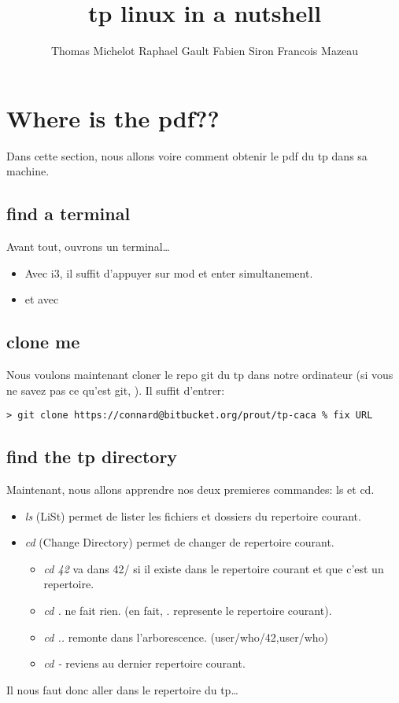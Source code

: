 \documentclass[a4paper]{article}
\title{tp \- linux in a nutshell}
\author{Thomas Michelot \- Raphael Gault \- Fabien Siron \- Francois Mazeau}
\begin{document}
\lstset{language=bash}
\maketitle
\newpage
\tableofcontents
\newpage
\section{Where is the pdf??}
Dans cette section, nous allons voire comment obtenir le pdf du tp dans
sa machine.
\subsection{find a terminal}
Avant tout, ouvrons un terminal\ldots 
\begin{itemize}
  \item Avec i3, il suffit d'appuyer sur mod et enter simultanement.
  \item et avec %
\end{itemize}
\subsection{clone me}
Nous voulons maintenant cloner le repo git du tp dans notre ordinateur (si vous
ne savez pas ce qu'est git, %
).
Il suffit d'entrer:
\begin{lstlisting}
> git clone https://connard@bitbucket.org/prout/tp-caca % fix URL
\end{lstlisting}

\subsection{find the tp directory}
Maintenant, nous allons apprendre nos deux premieres commandes: ls et cd.
\begin{itemize}
  \item \emph{ls} (LiSt) permet de lister les fichiers et dossiers du repertoire
    courant.
  \item \emph{cd} (Change Directory) permet de changer de repertoire courant.
    \begin{itemize}
      \item \emph{cd 42} va dans 42/ si il existe dans le repertoire courant et que
        c'est un repertoire.
      \item \emph{cd . } ne fait rien. (en fait, . represente le repertoire
        courant).
      \item \emph{cd ..} remonte dans l'arborescence. (user/who/42,user/who)
      \item \emph{cd -} reviens au dernier repertoire courant.
    \end{itemize}
\end{itemize}
Il nous faut donc aller dans le repertoire du tp\ldots
\end{document}
